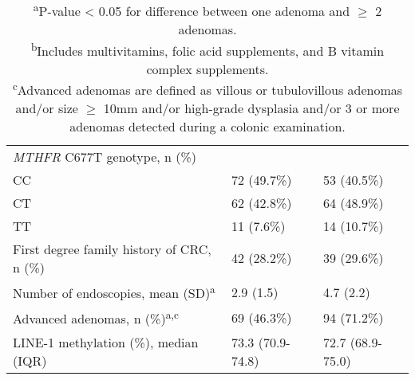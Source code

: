 \begin{table}
\begin{adjustbox}{width=\textwidth}
\begin{tabular}{L{6.4cm}C{3cm}C{3cm}}
{\textit{MTHFR}}{ C677T genotype, n (\%)}\\
\quad CC & 72 (49.7\%) & 53 (40.5\%)\\
\quad CT & 62 (42.8\%) & 64 (48.9\%)\\
\quad TT & 11 (7.6\%) & 14 (10.7\%)\\
First degree family history of CRC, n (\%) & 42 (28.2\%) & 39 (29.6\%)\\
Number of endoscopies, mean (SD)\textsuperscript{a} & 2.9 (1.5) & 4.7 (2.2)\\
Advanced adenomas, n (\%)\textsuperscript{a,c} & 69 (46.3\%) & 94 (71.2\%)\\
LINE-1 methylation (\%), median (IQR) & 73.3 (70.9-74.8) & 72.7 (68.9-75.0)\\
\hline
\end{tabular}
\end{adjustbox}
\caption*{\footnotesize{\textsuperscript{a}P-value < 0.05 for difference between one adenoma and $\geq$ 2 adenomas. \\ \textsuperscript{b}Includes multivitamins, folic acid supplements, and B vitamin complex supplements. \\ \textsuperscript{c}Advanced adenomas are defined as villous or tubulovillous adenomas and/or size $\geq$ 10mm and/or high-grade dysplasia and/or 3 or more adenomas detected during a colonic examination.}}
\end{table}


